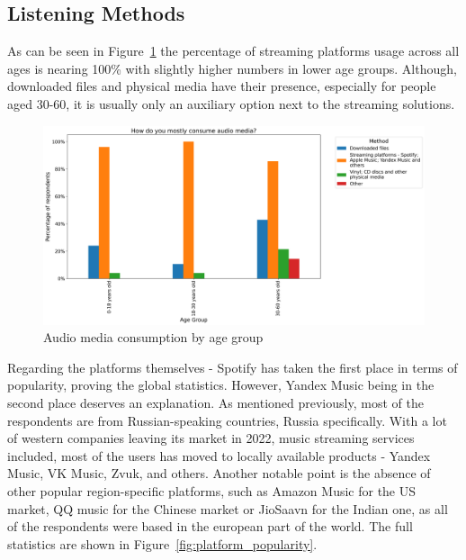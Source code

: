 \subsection{Listening Methods}
As can be seen in Figure~\ref{fig:consumption_methods} the percentage of streaming platforms
usage across all ages is nearing 100\% with slightly higher numbers in lower age groups.
Although, downloaded files and physical media have their presence,
especially for people aged 30-60, it is usually only an auxiliary option next to the streaming solutions.

\begin{figure}[htbp]
    \centering
    \includegraphics[height=0.4\textheight]{charts/constumption_method.png}
    \caption{Audio media consumption by age group}
    \label{fig:consumption_methods}
\end{figure}

Regarding the platforms themselves - Spotify has taken the first place in terms of popularity, proving the
global statistics\cite{spotifypopularity}. However, Yandex Music being in the second place deserves an explanation.
As mentioned previously, most of the respondents are from Russian-speaking countries, Russia specifically.
With a lot of western companies leaving its market in 2022, music streaming services included, most of the users has
moved to locally available products - Yandex Music, VK Music, Zvuk, and others.
Another notable point is the absence of other popular region-specific platforms, such as Amazon Music for the US market,
QQ music for the Chinese market or JioSaavn for the Indian one,
as all of the respondents were based in the european part of the world.
The full statistics are shown in Figure~\ref{fig:platform_popularity}.

